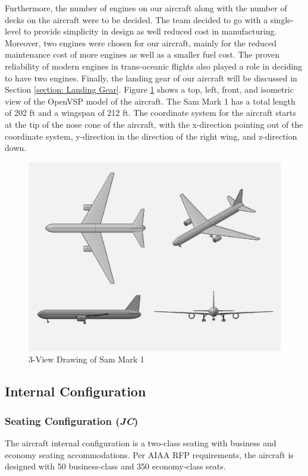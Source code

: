 Furthermore, the number of engines on our aircraft along with the number of decks on the aircraft were to be decided. The team decided to go with a single-level to provide simplicity in design as well reduced cost in manufacturing. Moreover, two engines were chosen for our aircraft, mainly for the reduced maintenance cost of more engines as well as a smaller fuel cost. The proven reliability of modern engines in trans-oceanic flights also played a role in deciding to have two engines. Finally, the landing gear of our aircraft will be discussed in Section \ref{section: Landing Gear}. Figure \ref{fig3view} shows a top, left, front, and isometric view of the OpenVSP model of the aircraft. The Sam Mark 1 has a total length of 202 ft and a wingspan of 212 ft. The coordinate system for the aircraft starts at the tip of the nose cone of the aircraft, with the x-direction pointing out of the coordinate system, y-direction in the direction of the right wing, and z-direction down. 

\begin{figure}[H]
        \centering
        \includegraphics[width=0.8\linewidth]{Photos/3-View_Aircraft_(2-12-20).pdf}
        \caption{3-View Drawing of Sam Mark 1}
        \label{fig3view}
        \end{figure}

\subsection{Internal Configuration}
\subsubsection{Seating Configuration (\textit{JC})}
The aircraft internal configuration is a two-class seating with business and economy seating accommodations.  Per AIAA RFP requirements, the aircraft is designed with 50 business-class and 350 economy-class seats.

